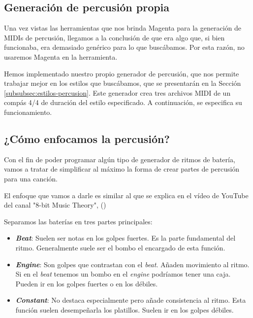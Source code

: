     \subsection{Generación de percusión propia}
    \label{subsec:generacion-percusion-propia}
    Una vez vistas las herramientas que nos brinda Magenta para la generación de MIDIs de percusión, llegamos a la conclusión de que era algo que, si bien funcionaba, era demasiado genérico para lo que buscábamos. Por esta razón, no usaremos Magenta en la herramienta.
    
    Hemos implementado nuestro propio generador de percusión, que nos permite trabajar mejor en los estilos que buscábamos, que se presentarán en la Sección \ref{subsubsec:estilos-percusion}. Este generador crea tres archivos MIDI de un compás 4/4 de duración del estilo especificado. A continuación, se especifica su funcionamiento.

    \subsection{¿Cómo enfocamos la percusión?}

    Con el fin de poder programar algún tipo de generador de ritmos de batería, vamos a tratar de simplificar al máximo la forma de crear partes de percusión para una canción.

    El enfoque que vamos a darle es similar al que se explica en el vídeo de YouTube del canal "8-bit Music Theory", (\cite{DrumPartsForNoDrummers})

    Separamos las baterías en tres partes principales:

    \begin{itemize}
        \item \textbf{\textit{Beat}}: Suelen ser notas en los golpes fuertes. Es la parte fundamental del ritmo. Generalmente suele ser el bombo el encargado de esta función.
        \item \textbf{\textit{Engine}}: Son golpes que contrastan con el \textit{beat}. Añaden movimiento al ritmo. Si en el \textit{beat} tenemos un bombo en el \textit{engine} podríamos tener una caja. Pueden ir en los golpes fuertes o en los débiles.
        \item \textbf{\textit{Constant}}: No destaca especialmente pero añade consistencia al ritmo. Esta función suelen desempeñarla los platillos. Suelen ir en los golpes débiles.
    \end{itemize}


